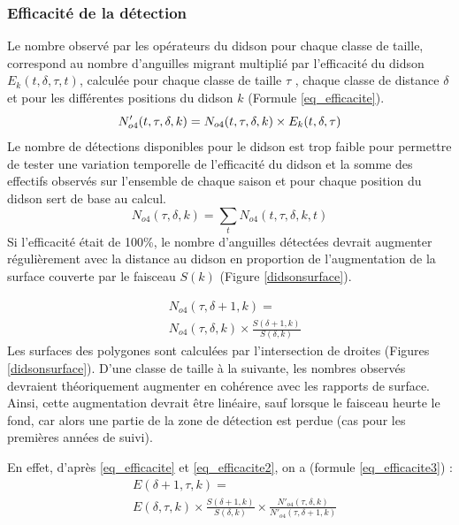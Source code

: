 \documentclass[11pt,twocolumn,titlepage,twoside]{article}
\begin{document}
\subsubsection{Efficacité de la détection}\label{par_traitement_efficacite}

Le nombre observé par les opérateurs du didson pour chaque classe de
taille, correspond au nombre d'anguilles
migrant multiplié par l'efficacité du didson $E_k(t,\delta,\tau,t)$, calculée pour
chaque classe de taille $\tau$ , chaque classe de distance $\delta$ et pour les
différentes positions du didson $k$ (Formule \ref{eq_efficacite}).
\begin{equation}
\label{eq_efficacite}
N'_{o4}(t,\tau,\delta,k)= N_{o4}(t,\tau,\delta,k) \times E_k(t,\delta,\tau)\\
\end{equation} 
Le nombre de détections disponibles pour le didson est trop faible
pour permettre de tester une variation temporelle de l'efficacité du didson et
la somme des effectifs observés sur l'ensemble de chaque saison et pour chaque
position du didson sert de base au calcul.
$$N_{o4}(\tau,\delta,k)=\sum_t N_{o4}(t,\tau,\delta,k,t)$$
Si l'efficacité était de 100\%, le nombre d'anguilles détectées devrait
augmenter régulièrement avec la distance au didson en proportion de
l'augmentation de la surface couverte par le faisceau $S(k)$ (Figure \ref{didsonsurface}). 

\begin{equation}
\label{eq_efficacite2}
\begin{aligned}
&N_{o4}(\tau,\delta+1,k)=\\
&N_{o4}(\tau,\delta,k) \times \frac{S(\delta+1,k)}{S(\delta,k)}
\end{aligned}
\end{equation} 
Les surfaces des polygones sont calculées par
l'intersection de droites \citep{murdoch_GpclibGeneralPolygon_2020} (Figures
\ref{didsonsurface}).
D'une classe de taille à la suivante, les nombres
observés devraient théoriquement augmenter en cohérence avec les rapports de
surface. Ainsi, cette augmentation devrait être
linéaire, sauf lorsque le faisceau heurte le fond, car alors une partie de la
zone de détection est perdue (cas pour les premières années de suivi).

En effet, d'après \ref{eq_efficacite} et \ref{eq_efficacite2}, on a (formule
\ref{eq_efficacite3}) :
\begin{equation}
\label{eq_efficacite3}
\begin{aligned}
& E(\delta+1,\tau,k)=\\
& E(\delta,\tau,k)\times\frac{S(\delta+1,k)}{S(\delta,k)}\times\frac{N'_{o4}(\tau,\delta,k)}{N'_{o4}(\tau,\delta+1,k)}\\
\end{aligned}
\end{equation} 
\end{document}
